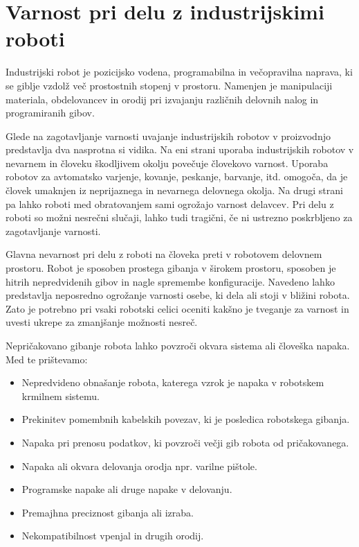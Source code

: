 


\chapter{Varnost pri delu z industrijskimi roboti}

Industrijski robot je pozicijsko vodena, programabilna in
večopravilna naprava, ki se giblje vzdolž več prostostnih stopenj v
prostoru. Namenjen je manipulaciji materiala, obdelovancev in orodij
pri izvajanju različnih delovnih nalog in programiranih gibov.

Glede na zagotavljanje varnosti uvajanje industrijskih robotov v
proizvodnjo predstavlja dva nasprotna si vidika. Na eni strani
uporaba industrijskih robotov v nevarnem in človeku škodljivem
okolju povečuje človekovo varnost. Uporaba robotov za avtomatsko
varjenje, kovanje, peskanje, barvanje, itd. omogoča, da je človek
umaknjen iz neprijaznega in nevarnega delovnega okolja. Na drugi
strani pa lahko roboti med obratovanjem sami ogrožajo varnost
delavcev. Pri delu z roboti so možni nesrečni slučaji, lahko tudi
tragični, če ni ustrezno poskrbljeno za zagotavljanje varnosti.

Glavna nevarnost pri delu z roboti na človeka preti v robotovem
delovnem prostoru. Robot je sposoben prostega gibanja v širokem
prostoru, sposoben je hitrih nepredvidenih gibov in nagle
spremembe konfiguracije. Navedeno lahko predstavlja neposredno
ogrožanje varnosti osebe, ki dela ali stoji v bližini robota. Zato
je potrebno pri vsaki robotski celici oceniti kakšno je tveganje
za varnost in uvesti ukrepe za zmanjšanje možnosti nesreč.

Nepričakovano gibanje robota lahko povzroči okvara sistema ali
človeška napaka. Med te prištevamo:
\begin{itemize}
    \item \vspace*{-0.1cm} Nepredvideno obnašanje robota, katerega vzrok je
    napaka v robotskem krmilnem sistemu.
    \item \vspace*{-0.1cm} Prekinitev pomembnih kabelskih povezav, ki je posledica
    robotskega gibanja.
    \item \vspace*{-0.1cm} Napaka pri prenosu podatkov, ki povzroči večji gib robota
    od pričakovanega.
    \item \vspace*{-0.1cm} Napaka ali okvara delovanja orodja npr.
    varilne pištole.
    \item \vspace*{-0.1cm} Programske napake ali druge napake v delovanju.
    \item \vspace*{-0.1cm} Premajhna preciznost gibanja ali izraba.
    \item \vspace*{-0.1cm} Nekompatibilnost vpenjal in drugih orodij.
\end{itemize}

